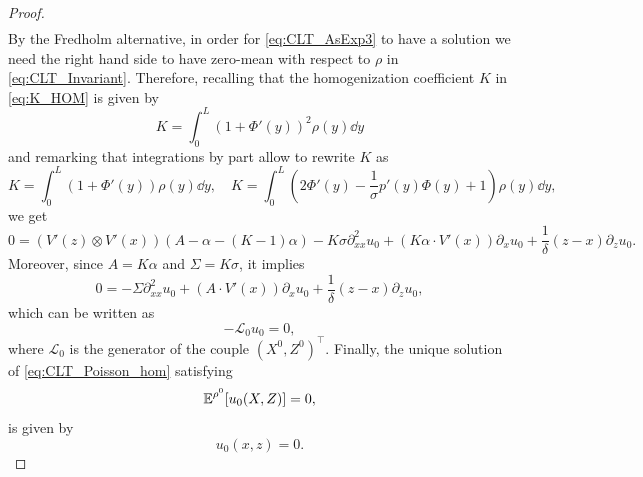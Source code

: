 \documentclass[10pt]{article}
\begin{document}
\begin{proof}
\begin{equation}
\begin{aligned}
	\end{aligned}
	\end{equation}
	By the Fredholm alternative, in order for \eqref{eq:CLT_AsExp3} to have a solution we need the right hand side to have zero-mean with respect to $\rho$ in \eqref{eq:CLT_Invariant}. Therefore, recalling that the homogenization coefficient $K$ in \eqref{eq:K_HOM} is given by
	\begin{equation}
		K = \int_0^L (1 + \Phi'(y))^2 \rho(y) \dd y
	\end{equation}
	and remarking that integrations by part allow to rewrite $K$ as
	\begin{equation}
		K = \int_0^L (1 + \Phi'(y)) \rho(y) \dd y, \quad  K = \int_0^L \left(2\Phi'(y) - \frac1\sigma p'(y) \Phi(y) + 1\right) \rho(y) \dd y,
	\end{equation}
	we get
	\begin{equation}
		0 = (V'(z) \otimes V'(x))(A - \alpha - (K - 1)\alpha) - K \sigma \partial^2_{xx}u_0 + \left(K \alpha \cdot V'(x)\right) \partial_x u_0  + \frac1\delta(z-x) \partial_z u_0.
	\end{equation}
	Moreover, since $A = K\alpha$ and $\Sigma = K\sigma$, it implies
	\begin{equation}
		0 = -\Sigma \partial^2_{xx}u_0 + \left(A \cdot V'(x)\right) \partial_x u_0  + \frac1\delta(z-x) \partial_z u_0,
	\end{equation}
	which can be written as
	\begin{equation}\label{eq:CLT_Poisson_hom}
		- \mathcal L_0 u_0 = 0,
	\end{equation}
	where $\mathcal L_0$ is the generator of the couple $(X^0,Z^0)^\top$. Finally, the unique solution of \eqref{eq:CLT_Poisson_hom} satisfying
	\begin{equation}
		\operatorname{\mathbb{E}}^{\rho^0}[u_0(X,Z)] = 0,
	\end{equation}
	is given by
	\begin{equation}
		u_0(x,z) = 0.
	\end{equation}
\end{proof}
\end{document}
